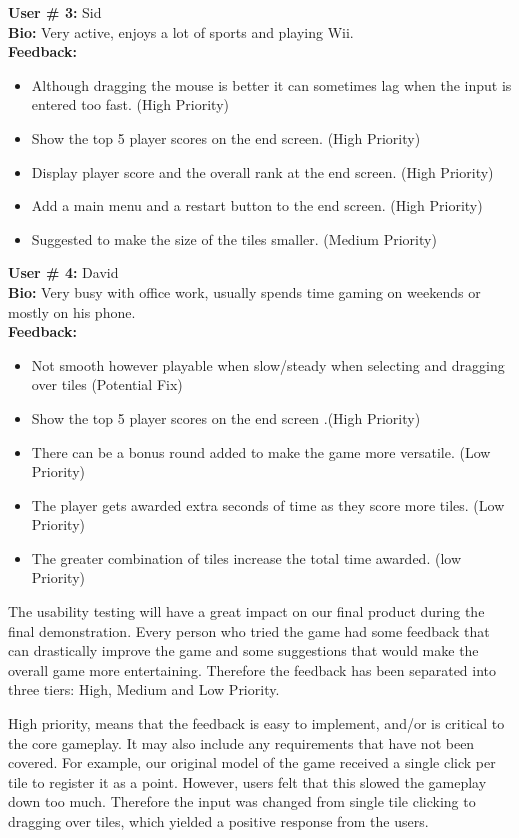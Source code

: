 \documentclass[12pt]{article}
\begin{document}
\textbf{User \# 3:}
Sid\\
\textbf{Bio:}
Very active, enjoys a lot of sports and playing Wii.\\
\textbf{Feedback:}
\begin{itemize}
 \item Although dragging the mouse is better it can sometimes lag when the input is entered too fast. (High Priority)
\item Show the top 5 player scores on the end screen. (High Priority)
\item Display player score and the overall rank at the end screen. (High Priority)
\item Add a main menu and a restart button to the end screen. (High Priority)
\item Suggested to make the size of the tiles smaller. (Medium Priority)
\end{itemize}
\textbf{User \# 4:}
David\\
\textbf{Bio:}
Very busy with office work, usually spends time gaming on weekends or mostly on his phone.\\
\textbf{Feedback:}
\begin{itemize}
 \item Not smooth however playable when slow/steady when selecting and dragging over tiles (Potential Fix)
\item Show the top 5 player scores on the end screen .(High Priority)
\item There can be a bonus round added to make the game more versatile. (Low Priority)
\item The player gets awarded extra seconds of time as they score more tiles. (Low Priority)
\item The greater combination of tiles increase the total time awarded.  (low Priority)
\end{itemize}

The usability testing will have a great impact on our final product during the final demonstration. Every person who tried the game had some feedback that can drastically improve the game and some suggestions that would make the overall game more entertaining. Therefore the feedback has been separated into three tiers: High, Medium and Low Priority. 

High priority, means that the feedback is easy to implement, and/or is critical to the core gameplay. It may also include any requirements that have not been covered. For example, our original model of the game received a single click per tile to register it as a point. However, users felt that this slowed the gameplay down too much. Therefore the input was changed from single tile clicking to dragging over tiles, which yielded a positive response from the users. 
\end{document}
